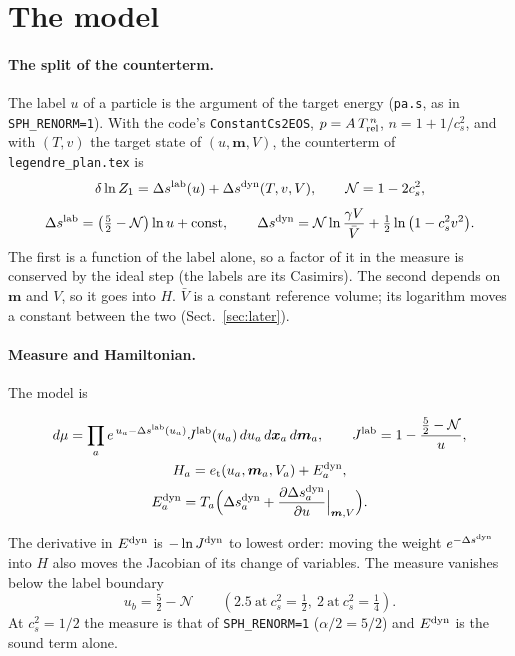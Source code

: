 \documentclass[11pt,aps,preprint,nofootinbib,superscriptaddress,tightenlines]{revtex4-2}
\def\st{\begin{equation}}
\def\stp{\end{equation}}
\def\Sect#1{Sect.~\ref{#1}}
\let\oldparagraph\paragraph
\renewcommand{\paragraph}{\par\bigskip\oldparagraph}
\begin{document}
\section{The model}
\label{sec:model}

\paragraph{The split of the counterterm.}  The label $u$ of a particle is the argument of the target energy (\texttt{pa.s}, as in \texttt{SPH\_RENORM=1}).  With
the code's \texttt{ConstantCs2EOS}, $p=A\,T_{\rm rel}^{\,n}$, $n=1+1/c_s^2$, and with $(T,v)$ the target state of $(u,\bm m,V)$, the counterterm of
\nolinkurl{legendre_plan.tex} is
\st
\delta\ln Z_1=\Delta s^{\rm lab}(u)+\Delta s^{\rm dyn}(T,v,V),\qquad \mathcal N=1-2c_s^2 ,
\stp
\st
\Delta s^{\rm lab}=\big(\tfrac52-\mathcal N\big)\ln u+{\rm const},\qquad
\Delta s^{\rm dyn}=\mathcal N\ln\frac{\gamma V}{\bar V}+\tfrac12\ln\big(1-c_s^2v^2\big) .
\label{split}
\stp
The first is a function of the label alone, so a factor of it in the measure is conserved by the ideal step (the labels are its Casimirs).  The second depends on
$\bm m$ and $V$, so it goes into $H$.  $\bar V$ is a constant reference volume; its logarithm moves a constant between the two (\Sect{sec:later}).

\paragraph{Measure and Hamiltonian.}  The model is
\begin{keyeq}
\st
\begin{gathered}
d\mu=\prod_a e^{\,u_a-\Delta s^{\rm lab}(u_a)}J^{\rm lab}(u_a)\,du_a\,d\bm x_a\,d\bm m_a,\qquad J^{\rm lab}=1-\frac{\tfrac52-\mathcal N}{u},\\
H_a=e_{\rm t}(u_a,\bm m_a,V_a)+E^{\rm dyn}_a,\\
E^{\rm dyn}_a=T_a\Big(\Delta s^{\rm dyn}_a+\frac{\partial\Delta s^{\rm dyn}_a}{\partial u}\Big|_{\bm m,V}\Big) .
\end{gathered}
\label{model}
\stp
\end{keyeq}
The derivative in $E^{\rm dyn}$ is $-\ln J^{\rm dyn}$ to lowest order: moving the weight $e^{-\Delta s^{\rm dyn}}$ into $H$ also moves the Jacobian of its change of
variables.  The measure vanishes below the label boundary
\st
u_b=\tfrac52-\mathcal N\qquad(2.5\ \text{at}\ c_s^2=\tfrac12,\ 2\ \text{at}\ c_s^2=\tfrac14) .
\stp
At $c_s^2=1/2$ the measure is that of \texttt{SPH\_RENORM=1} ($\alpha/2=5/2$) and $E^{\rm dyn}$ is the sound term alone.
\end{document}
